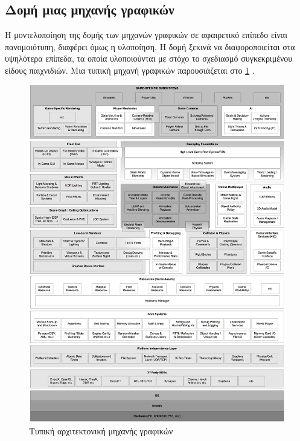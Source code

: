 \subsection{Δομή μιας μηχανής γραφικών}
Η μοντελοποίηση της δομής των μηχανών γραφικών σε αφαιρετικό επίπεδο είναι πανομοιότυπη, διαφέρει όμως η υλοποίηση. Η δομή ξεκινά να διαφοροποιείται στα υψηλότερα επίπεδα, τα οποία υλοποιούνται με στόχο το σχεδιασμό συγκεκριμένου είδους παιχνιδιών. Μια τυπική μηχανή γραφικών παρουσιάζεται στο \ref{fig:Game_Engine_Architecture} \cite{gregory2009game}.
	\begin{figure}
		\centering
		\includegraphics[width=160mm]{Images/game_engine_architecture}
		\caption{Τυπική αρχιτεκτονική μηχανής γραφικών}
		\label{fig:Game_Engine_Architecture}
	\end{figure}	

